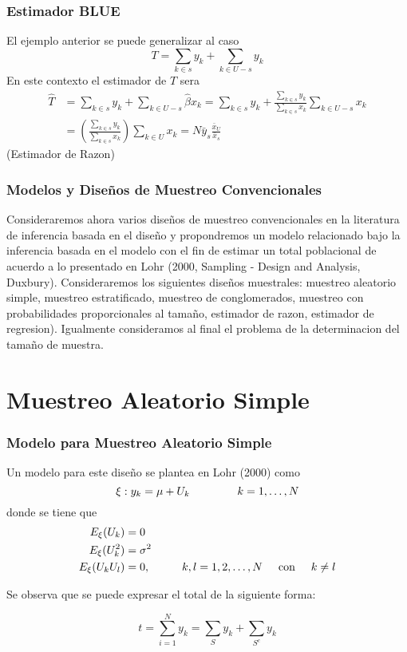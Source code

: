 ﻿\documentclass{beamer}
\begin{document}
\begin{frame}[allowframebreaks*]
\frametitle{Estimador BLUE}
El ejemplo anterior se puede generalizar al caso
\begin{equation*}
  T=\sum\limits_{k \in s} y_k + \sum\limits_{k \in U-s} y_k
\end{equation*}
En este contexto el estimador de $T$ sera
\begin{align*}
  \hat{T}&=\sum\limits_{k \in s} y_k + \sum\limits_{k \in U-s} \hat{\beta} x_{k} = \sum\limits_{k \in s} y_k + \frac{\sum\limits_{k \in s} y_k}{\sum\limits_{k \in s} x_k} \sum\limits_{k \in U-s} x_k \\
  &= \left(\frac{\sum\limits_{k \in s} y_k}{\sum\limits_{k \in s} x_k}\right) \sum\limits_{k \in U} x_k = N\bar{y}_s \frac{\bar{x}_U}{\bar{x}_s}
\end{align*}
(Estimador de Razon)
\end{frame}

\begin{frame}[allowframebreaks*]
\frametitle{Modelos y Dise\~nos de Muestreo Convencionales}
Consideraremos ahora varios dise\~nos de muestreo convencionales en la literatura de inferencia basada en el dise\~no y propondremos un modelo relacionado bajo la inferencia basada en el modelo con el fin de estimar un total poblacional de acuerdo a lo presentado en Lohr (2000, Sampling - Design and Analysis, Duxbury). Consideraremos los siguientes dise\~nos muestrales: muestreo aleatorio simple, muestreo estratificado, muestreo de conglomerados, muestreo con probabilidades proporcionales al tama\~no, estimador de razon, estimador de regresion). Igualmente consideramos al final el problema de la determinacion del tama\~no de muestra.
\end{frame}

\section{Muestreo Aleatorio Simple}
 \tableofcontents[currentsection]

\begin{frame}[allowframebreaks*]
\frametitle{Modelo para Muestreo Aleatorio Simple}
{\footnotesize
Un modelo para este dise\~no se plantea en Lohr (2000) como
$$\xi: y_k = \mu + U_k \hspace{1.5cm} k=1,\ldots,N$$
donde se tiene que
\begin{align*}
E_{\xi}(U_k)&=0 \\
E_{\xi}(U_k^2)&=\sigma^2\\
E_{\xi}(U_k U_l)&=0, \hspace{1cm} k,l = 1, 2, \ldots, N \hspace{.5cm} \text{con} \hspace{.5cm} k \neq l
\end{align*}

Se observa que se puede expresar el total de la siguiente forma:

\begin{equation*}
t=\sum\limits_{i=1}^Ny_k=\sum\limits_{S}y_k+\sum\limits_{S^c}y_k
\end{equation*}}
\end{frame}
\end{document}

